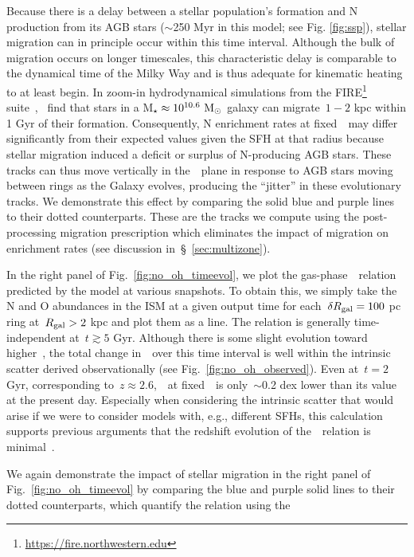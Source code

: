 \documentclass[ms.tex]{subfiles}
\begin{document}
Because there is a delay between a stellar population's formation and N
production from its AGB stars ($\sim$250 Myr in this model; see Fig.
\ref{fig:ssp}), stellar migration can in principle occur within this time
interval.
Although the bulk of migration occurs on longer timescales, this characteristic
delay is comparable to the dynamical time of the Milky Way and is thus adequate
for kinematic heating to at least begin.
In zoom-in hydrodynamical simulations from the FIRE\footnote{
	\url{https://fire.northwestern.edu}
} suite~\citep{Hopkins2014},~\citet{El-Badry2016} find that stars in a
M$_\star \approx 10^{10.6}~\text{M}_\odot$ galaxy can migrate~$1 - 2$ kpc within 1 Gyr
of their formation.
Consequently, N enrichment rates at fixed~\rgal~may differ significantly from
their expected values given the SFH at that radius because stellar migration
induced a deficit or surplus of N-producing AGB stars.
These tracks can thus move vertically in the~\ohno~plane in response to AGB
stars moving between rings as the Galaxy evolves, producing the ``jitter'' in
these evolutionary tracks.
We demonstrate this effect by comparing the solid blue and purple lines to
their dotted counterparts.
These are the tracks we compute using the post-processing migration
prescription which eliminates the impact of migration on enrichment rates (see
discussion in~\S~\ref{sec:multizone}).
\par
In the right panel of Fig.~\ref{fig:no_oh_timeevol}, we plot the
gas-phase~\ohno~relation predicted by the model at various snapshots.
To obtain this, we simply take the N and O abundances in the ISM at a given
output time for each~$\delta R_\text{gal} = 100$ pc ring at~$R_\text{gal} > 2$ kpc and plot
them as a line.
The relation is generally time-independent at~$t \gtrsim 5$ Gyr.
Although there is some slight evolution toward higher~\no, the total change
in~\no~over this time interval is well within the intrinsic scatter derived
observationally (see Fig.~\ref{fig:no_oh_observed}).
Even at~$t = 2$ Gyr, corresponding to~$z \approx 2.6$,~\no~at fixed~\oh~is
only~$\sim$0.2 dex lower than its value at the present day.
Especially when considering the intrinsic scatter that would arise if we were
to consider models with, e.g., different SFHs, this calculation supports
previous arguments that the redshift evolution of the~\ohno~relation is
minimal~\citep{Vincenzo2018, HaydenPawson2021}.
\par
We again demonstrate the impact of stellar migration in the right panel of
Fig.~\ref{fig:no_oh_timeevol} by comparing the blue and purple solid lines
to their dotted counterparts, which quantify the relation using the
\end{document}
